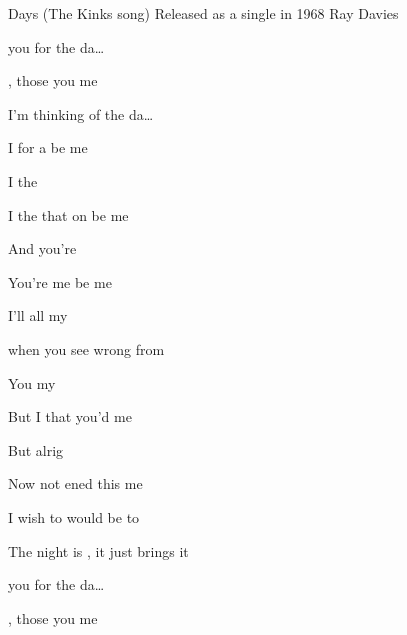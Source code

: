 \begin{SBSong}{Days (The Kinks song)}
  {Released as a single in 1968}
  {Ray Davies}
  \begin{SBVerse}
 	 you for the da\ldots{}

 	  , 
      those   you  me 

    I'm thinking of the da\ldots{}
    
    I  for  a   be me  

    I  the 

    I  the  that  on  be me   

    And  you're 

    You're  me    be me  
  \end{SBVerse}
  \begin{SBVerse}
 	 I'll  all my 

 	 when you  see wrong from 

	You  my 

	But  I  that   you'd  me 

	But  alrig

    Now  not ened	 this   me 
  \end{SBVerse}
  \begin{SBVerse}
    I wish to would be to
    
    The night is , it just brings   it  
  \end{SBVerse}
  \ifChordBk
    \begin{SBVerse}
       you for the da\ldots{}

        , 
        those   you  me 


\end{SBVerse}
\end{SBSong}
